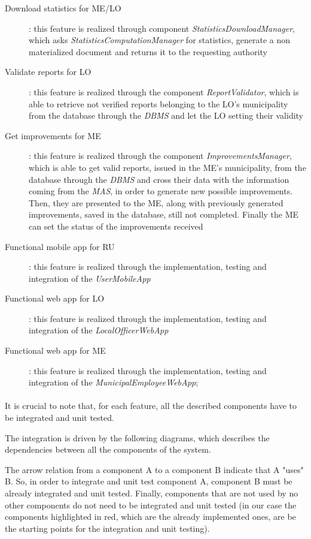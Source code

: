 \begin{description}
				\item [Download statistics for ME/LO]: this feature is realized through component \textit{StatisticsDownloadManager}, which asks \textit{StatisticsComputationManager} for statistics, generate a non materialized document and returns it to the requesting authority
				\item [Validate reports for LO]: this feature is realized through the component \textit{ReportValidator}, which is able to retrieve not verified reports belonging to the LO's municipality from the database through the \textit{DBMS} and let the LO setting their validity
				\item [Get improvements for ME]: this feature is realized through the component \textit{ImprovementsManager}, which is able to get valid reports, issued in the ME's municipality, from the database through the \textit{DBMS} and cross their data with the information coming from the \textit{MAS}, in order to generate new possible improvements. Then, they are presented to the ME, along with previously generated improvements, saved in the database, still not completed. Finally the ME can set the status of the improvements received
				\item [Functional mobile app for RU]: this feature is realized through the implementation, testing and integration of the \textit{UserMobileApp}
				\item [Functional web app for LO]: this feature is realized through the implementation, testing and integration of the \textit{LocalOfficerWebApp}
				\item [Functional web app for ME]: this feature is realized through the implementation, testing and integration of the \textit{MunicipalEmployeeWebApp};
			\end{description}
		\paragraph{}
			It is crucial to note that, for each feature, all the described components have to be integrated and unit tested. 
			
			The integration is driven by the following diagrams, which describes the dependencies between all the components of the system. 
			
			The arrow relation from a component A to a component B indicate that A "uses" B. So, in order to integrate and unit test component A, component B must be already integrated and unit tested. Finally, components that are not used by no other components do not need to be integrated and unit tested (in our case the components highlighted in red, which are the already implemented ones, are be the starting points for the integration and unit testing).
			
